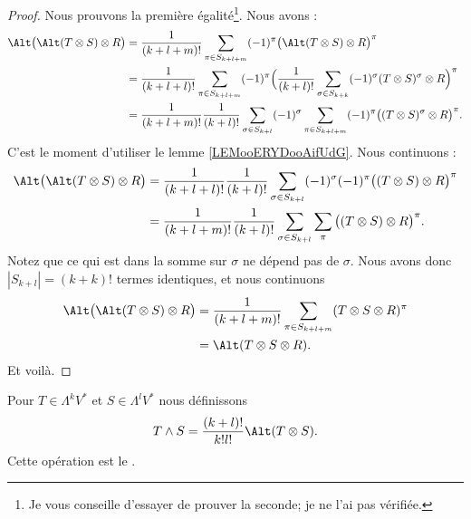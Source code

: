 \begin{proof}
	Nous prouvons la première égalité\footnote{Je vous conseille d'essayer de prouver la seconde; je ne l'ai pas vérifiée.}. Nous avons :
	\begin{subequations}
		\begin{align}
			\Alt\big( \Alt(T\otimes S)\otimes R \big) & =\frac{1}{ (k+l+m)!}\sum_{\pi\in S_{k+l+m}}(-1)^{\pi}\big( \Alt(T\otimes S)\otimes R \big)^{\pi}                                                             \\
			                                          & =\frac{1}{ (k+l+l)!}\sum_{\pi\in S_{k+l+m}}(-1)^{\pi}\Big( \frac{1}{ (k+l)!}\sum_{\sigma\in S_{k+k}}(-1)^{\sigma}(T\otimes S)^{\sigma}\otimes R \Big)^{\pi}  \\
			                                          & =\frac{1}{ (k+l+m)!}\frac{1}{ (k+l)!}\sum_{\sigma\in S_{k+l}}(-1)^{\sigma}\sum_{\pi\in S_{k+l+m}}(-1)^{\pi}\big( (T\otimes S)^{\sigma}\otimes R \big)^{\pi}.
		\end{align}
	\end{subequations}
	C'est le moment d'utiliser le lemme \ref{LEMooERYDooAifUdG}. Nous continuons :
	\begin{subequations}
		\begin{align}
			\Alt\big( \Alt(T\otimes S)\otimes R \big) & = \frac{1}{ (k+l+l)!}\frac{1}{ (k+l)!}\sum_{\sigma\in S_{k+l}}(-1)^{\sigma}(-1)^{\pi}\big( (T\otimes S)\otimes R \big)^{\pi} \\
			                                          & =\frac{1}{ (k+l+m)!}\frac{1}{ (k+l)!}\sum_{\sigma\in S_{k+l}}\sum_{\pi}\big( (T\otimes S)\otimes R \big)^{\pi}.
		\end{align}
	\end{subequations}
	Notez que ce qui est dans la somme sur \( \sigma\) ne dépend pas de \( \sigma\). Nous avons donc \( | S_{k+l} |=(k+k)!\) termes identiques, et nous continuons
	\begin{subequations}
		\begin{align}
			\Alt\big( \Alt(T\otimes S)\otimes R \big) & = \frac{1}{ (k+l+m)!}\sum_{\pi\in S_{k+l+m}}(T\otimes S\otimes R)^{\pi} \\
			                                          & =\Alt(T\otimes S\otimes R).
		\end{align}
	\end{subequations}
	Et voilà.
\end{proof}

\begin{definition}		\label{DEFooCTSPooZRIufr}
	Pour \( T\in \Lambda^kV^*\) et \( S\in\Lambda^lV^*\) nous définissons
	\begin{equation}
		T\wedge S=\frac{ (k+l)! }{ k!l! }\Alt(T\otimes S).
	\end{equation}
	Cette opération est le .
\end{definition}

